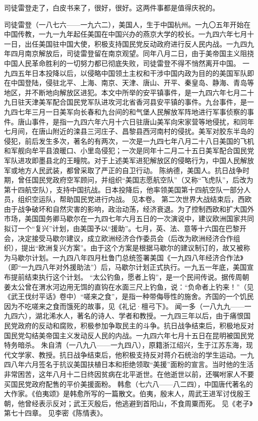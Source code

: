 司徒雷登走了，白皮书来了，很好，很好。这两件事都是值得庆祝的。


\begin{maonote}
司徒雷登（一八七六——一九六二），美国人，生于中国杭州。一九〇五年开始在中国传教，一九一九年起任美国在中国兴办的燕京大学的校长。一九四六年七月十一日，出任美国驻中国大使，积极支持国民党反动政府进行反人民内战。一九四九年四月南京解放后，司徒雷登留在南京观望。同年八月二日，由于美帝国主义阻挠中国人民革命胜利的一切努力都已彻底失败，司徒雷登不得不悄然离开中国。
一九四五年日本投降以后，以侵略中国领土主权和干涉中国内政为目的的美国军队即在中国登陆，侵驻北平、上海、南京、天津、唐山、开平、秦皇岛、静海、青岛等地区，并不断地向解放区进犯。本文中所举的安平镇事件，是一九四六年七月二十九日驻天津美军配合国民党军队进攻河北省香河县安平镇的事件。九台事件，是一九四七年三月一日美军向长春和九台间的和气堡人民解放军阵地进行军事侦察的事件。唐山事件，是指一九四六年六月十六日驻唐山美军向宋家营等地侵扰，和同年七月间，在唐山附近的滦县三河庄子、昌黎县西河南村的侵扰。美军对胶东半岛的侵犯，前后发生多次，著名的有两次，一次是一九四七年八月二十八日美国的飞机和军舰向牟平县浪暖口、小里岛侵犯；一次是同年十二月二十五日美军配合国民党军队进攻即墨县北的王疃院。对于上述美军进犯解放区的侵略行为，中国人民解放军或地方人民武装，都曾采取了严正的自卫行动。
陈纳德，美国人。抗日战争时期，曾任国民党政府空军顾问，并组织“美国志愿航空队”（又称“飞虎队”，后改为第十四航空队），支持中国抗战。日本投降后，他率领美国第十四航空队一部分人员，组织空运队，帮助国民党进行内战。
见本卷。
第二次世界大战结束后，西欧由于战争破坏和自然灾害的影响，政治动荡，经济衰退。为了控制西欧和扩大国外市场，美国国务卿马歇尔在一九四七年六月五日的一次演说中，建议欧洲国家共同拟订一个“复兴”计划，由美国予以“援助”。七月，英、法、意等十六国在巴黎开会，决定接受马歇尔建议，成立欧洲经济合作委员会（后改为欧洲经济合作组织），提出“欧洲复兴方案”。由于这个方案是根据马歇尔的建议制订的，故又被称为马歇尔计划。一九四八年四月杜鲁门总统签署美国《一九四八年经济合作法》（即“一九四八年对外援助法”）后，马歇尔计划正式执行。一九五一年底，美国宣布提前结束执行这个计划。
“太公钓鱼，愿者上钩”，是一个民间传说。据传周朝姜太公曾在渭水河边用无饵的直钩在水面三尺上钓鱼，说：“负命者上钓来！”（见《武王伐纣平话》卷中）“嗟来之食”，是指一种带侮辱性的施舍。齐国的一个饥民因为不吃嗟来之食而饿死的故事，见《礼记·檀弓下》。
闻一多（一八九九——一九四六），湖北浠水人，著名的诗人、学者和教授。一九四三年以后，由于痛恨国民党政府的反动和腐败，积极参加争取民主的斗争。抗日战争结束后，积极地反对国民党勾结美帝国主义发动反人民的内战。一九四六年七月十五日在昆明被国民党特务暗杀。
朱自清（一八九八——一九四八），原籍浙江绍兴，生于江苏东海，现代文学家、教授。抗日战争结束后，他积极支持反对蒋介石统治的学生运动。一九四八年六月签名于抗议美国扶植日本和拒绝领取“美援”面粉的宣言。当时他的生活非常困苦，这年八月十二日终因贫病在北平逝世。在他逝世以前，还嘱咐家人不要买国民党政府配售的平价美援面粉。
韩愈（七六八——八二四），中国唐代著名的大作家。《伯夷颂》是韩愈所写的一篇散文。伯夷，殷末人，周武王进军讨伐殷王朝，他曾经表示反对；武王灭殷后，他逃避到首阳山，不食周粟而死。
见《老子》第七十四章。
见李密《陈情表》。
\end{maonote}
